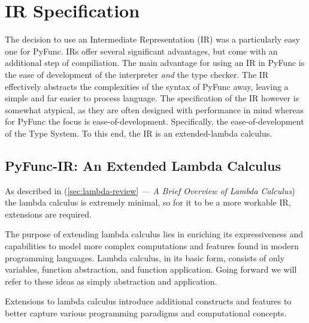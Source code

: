 \documentclass{l4proj}
\begin{document}
\section{IR Specification}
The decision to use an Intermediate Representation (IR) was a particularly easy one for PyFunc.
IRs offer several significant advantages, but come with an additional step of compiliation.
The main advantage for using an IR in PyFunc is the ease of development of the interpreter \emph{and} the type checker.
The IR effectively abstracts the complexities of the syntax of PyFunc away, leaving a simple and far easier to process language.
The specification of the IR however is somewhat atypical, as they are often designed with performance in mind whereas for PyFunc the focus is ease-of-development.
Specifically, the ease-of-development of the Type System.
To this end, the IR is an extended-lambda calculus.

\subsection{PyFunc-IR: An Extended Lambda Calculus}
As described in (\ref{sec:lambda-review} \emph{— A Brief Overview of Lambda Calculus}) the lambda calculus is extremely minimal, so for it to be a more workable IR, extensions are required.

The purpose of extending lambda calculus lies in enriching its expressiveness and capabilities to model more complex computations and features found in modern programming languages.
Lambda calculus, in its basic form, consists of only variables, function abstraction, and function application.
Going forward we will refer to these ideas as simply abstraction and application.

Extensions to lambda calculus introduce additional constructs and features to better capture various programming paradigms and computational concepts.
\end{document}
